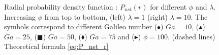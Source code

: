 \begin{figure}
    \centering
    \caption{Radial probability density function : $P_{nst}(r)$ for different $\phi$ and $\lambda$. 
    Increasing $\phi$ from top to bottom, (left) $\lambda = 1$ (right) $\lambda = 10$. 
    The symbols correspond to different Galileo number ($\bullet$) $Ga = 10$, ($\blacktriangle$) $Ga = 25$, ($\blacksquare$) $Ga = 50$, ($\blacklozenge$) $Ga = 75$ and ($\blacktriangleright$) $\phi = 100$.
    (dashed lines) Theoretical formula \ref{eq:P_nst_r}}
    \label{fig:P_nst_r}
\end{figure}
